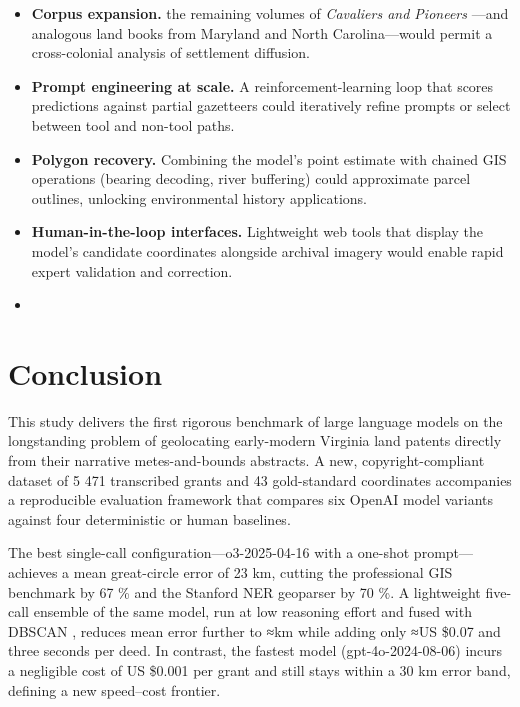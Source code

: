 \begin{itemize}
\tightlist
\item
  \textbf{Corpus expansion.} \DIFdelbegin {}\DIFdelend \DIFaddbegin {}\DIFaddend the remaining volumes of
  \emph{Cavaliers and Pioneers} \citep{Nugent1979_cavaliers3}---and
  analogous land books from Maryland and North Carolina---would permit a
  cross-colonial analysis of settlement diffusion.
\item
  \textbf{Prompt engineering at scale.} A reinforcement-learning loop
  that scores predictions against partial gazetteers could iteratively
  refine prompts or select between tool and non-tool paths.
\item
  \textbf{Polygon recovery.} Combining the model's point estimate with
  chained GIS operations (bearing decoding, river buffering) could
  approximate parcel outlines, unlocking environmental history
  applications.
\item
  \textbf{Human-in-the-loop interfaces.} Lightweight web tools that
  display the model's candidate coordinates alongside archival imagery
  would enable rapid expert validation and correction.
\DIFaddbegin \item
  \textbf{} \DIFaddend \end{itemize}

\section{Conclusion}\label{conclusion}

This study delivers the first rigorous benchmark of large language
models on the longstanding problem of geolocating early-modern Virginia
land patents directly from their narrative metes-and-bounds abstracts. A
new, copyright-compliant dataset of 5 471 transcribed grants and 43
gold-standard coordinates accompanies a reproducible evaluation
framework that compares six OpenAI model variants against four
deterministic or human baselines.

The best single-call configuration---o3-2025-04-16 with a one-shot
prompt---achieves a mean great-circle error of 23 km, cutting the
professional GIS benchmark by 67 \% and the Stanford NER geoparser by 70
\%. A lightweight five-call ensemble of the same model, run at low
reasoning effort and fused with DBSCAN \DIFaddbegin {}\DIFaddend , reduces mean error
further to ≈\DIFdelbegin {}\DIFdelend \DIFaddbegin {}\DIFaddend km while adding only ≈US \$0.07 and three seconds per
deed. In contrast, the fastest model (gpt-4o-2024-08-06) incurs a
negligible cost of US \$0.001 per grant and still stays within a 30 km
error band, defining a new speed--cost frontier.

